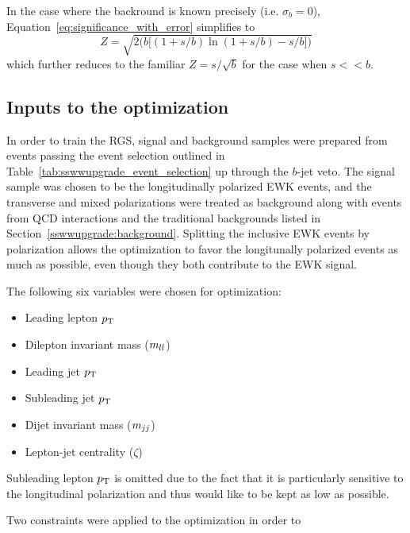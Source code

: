 In the case where the backround is known precisely (i.e. $\sigma_b = 0$), Equation~\ref{eq:significance_with_error} simplifies to
\begin{equation}
Z = \sqrt{2\bigg(b\big[(1+s/b)\ln(1+s/b)-s/b\big]\bigg)}
\label{eq:significance_without_error}
\end{equation}
which further reduces to the familiar $Z = s/\sqrt{b}$ for the case when $s << b$.

%
\subsection{Inputs to the optimization}\label{sswwupgrade:opt_inputs}
In order to train the RGS, signal and background samples were prepared from events passing the event selection outlined in Table~\ref{tab:sswwupgrade_event_selection} up through the $b$-jet veto.
The signal sample was chosen to be the longitudinally polarized \ssww EWK events, and the transverse and mixed polarizations were treated as background along with \ssww events from QCD interactions and the traditional backgrounds listed in Section~\ref{sswwupgrade:background}.
Splitting the inclusive \ssww EWK events by polarization allows the optimization to favor the longitunally polarized events as much as possible, even though they both contribute to the EWK signal.

The following six variables were chosen for optimization:
\begin{itemize}
\item Leading lepton $p_{\mathrm{T}}$
\item Dilepton invariant mass ($m_{ll}$)
\item Leading jet $p_{\mathrm{T}}$
\item Subleading jet $p_{\mathrm{T}}$
\item Dijet invariant mass ($m_{jj}$)
\item Lepton-jet centrality ($\zeta$)
\end{itemize}
Subleading lepton $p_{\mathrm{T}}$ is omitted due to the fact that it is particularly sensitive to the longitudinal polarization and thus would like to be kept as low as possible.

Two constraints were applied to the optimization in order to

